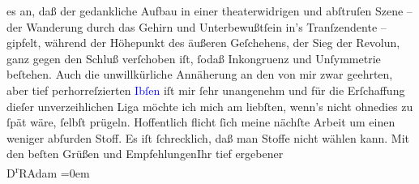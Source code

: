                    es an, daß der gedankliche Aufbau in einer theaterwidrigen und abſtruſen Szene –
                    der Wanderung durch das Gehirn {\pb}und
                    Unterbewußtſein in’s Tranſzendente – gipfelt, während der Höhepunkt des äußeren
                    Geſchehens, der Sieg der Revolun, ganz gegen den Schluß verſchoben iſt, ſodaß Inkongruenz und
                    Unſymmetrie beſtehen. Auch die unwillkürliche Annäherung an den von mir zwar
                    geehrten, aber tief perhorreſzierten \textcolor{blue}{Ibſen}{}\ledrightnote{\textcolor{blue}{Henrik Ibsen}}
                    iſt mir ſehr unangenehm und für die Erſchaffung dieſer unverzeihlichen Liga
                    möchte ich mich am liebſten, wenn’s nicht ohnedies zu ſpät wäre, ſelbſt
                    prügeln.\pend
           \pstart
           Hoffentlich flicht ſich meine nächſte Arbeit um einen weniger abſurden Stoff. Es
                    iſt ſchrecklich, daß man Stoffe nicht wählen kann.\pend
           \pstart
           Mit den beſten Grüßen und Empfehlungen\hspace*{1.5em}Ihr\pend
           \pstart
           tief ergebener{\\[\baselineskip]}\spacefill\mbox{D\textsuperscript{r}RAdam}\pend
           \leftskip=0em{}\endnumbering{}  
      